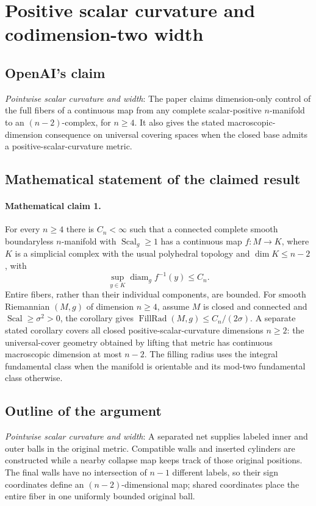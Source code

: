 \documentclass[11pt]{article}
\begin{document}
\section*{Positive scalar curvature and codimension-two width}

\subsection{OpenAI's claim}
\textit{Pointwise scalar curvature and width}: The paper claims dimension-only control of the full fibers of a continuous map from any complete scalar-positive $n$-manifold to an $(n-2)$-complex, for $n\ge4$. It also gives the stated macroscopic-dimension consequence on universal covering spaces when the closed base admits a positive-scalar-curvature metric.

\subsection{Mathematical statement of the claimed result}
\paragraph{Mathematical claim 1.} For every $n\ge4$ there is $C_n<\infty$ such that a connected complete smooth boundaryless $n$-manifold with $\operatorname{Scal}_g\ge1$ has a continuous map $f:M\to K$, where $K$ is a simplicial complex with the usual polyhedral topology and $\dim K\le n-2$, with \[\sup_{y\in K}\operatorname{diam}_g f^{-1}(y)\le C_n.\] Entire fibers, rather than their individual components, are bounded. For smooth Riemannian $(M,g)$ of dimension $n\ge4$, assume $M$ is closed and connected and $\operatorname{Scal}\ge\sigma^2>0$, the corollary gives $\operatorname{FillRad}(M,g)\le C_n/(2\sigma)$. A separate stated corollary covers all closed positive-scalar-curvature dimensions $n\ge2$: the universal-cover geometry obtained by lifting that metric has continuous macroscopic dimension at most $n-2$. The filling radius uses the integral fundamental class when the manifold is orientable and its mod-two fundamental class otherwise.

\subsection{Outline of the argument}
\textit{Pointwise scalar curvature and width}: A separated net supplies labeled inner and outer balls in the original metric. Compatible walls and inserted cylinders are constructed while a nearby collapse map keeps track of those original positions. The final walls have no intersection of $n-1$ different labels, so their sign coordinates define an $(n-2)$-dimensional map; shared coordinates place the entire fiber in one uniformly bounded original ball.
\end{document}
